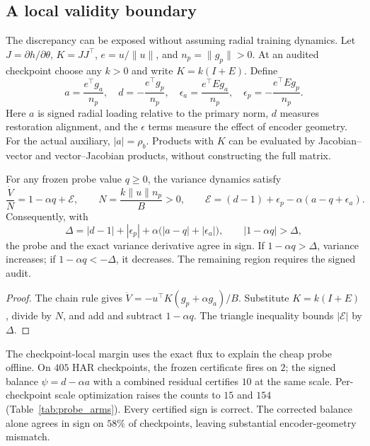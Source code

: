 \subsection{A local validity boundary}

The discrepancy can be exposed without assuming radial training dynamics. Let $J=\partial h/\partial\theta$, $K=JJ^\top$, $e=u/\|u\|$, and $n_p=\|g_p\|>0$. At an audited checkpoint choose any $k>0$ and write $K=k(I+E)$. Define
\begin{equation}
 a=\frac{e^\top g_a}{n_p},\quad d=-\frac{e^\top g_p}{n_p},\quad
 \epsilon_a=\frac{e^\top E g_a}{n_p},\quad
 \epsilon_p=-\frac{e^\top E g_p}{n_p}.
 \label{eq:boundary_terms}
\end{equation}
Here $a$ is signed radial loading relative to the primary norm, $d$ measures restoration alignment, and the $\epsilon$ terms measure the effect of encoder geometry. For the actual auxiliary, $|a|=\rho_b$. Products with $K$ can be evaluated by Jacobian--vector and vector--Jacobian products, without constructing the full matrix.

\begin{theorem}\label{thm:probe_boundary}
For any frozen probe value $q\ge0$, the variance dynamics satisfy
\begin{equation}
 \frac{\dot V}{N}=1-\alpha q+\mathcal E,\qquad
 N=\frac{k\|u\|n_p}{B}>0,\qquad
 \mathcal E=(d-1)+\epsilon_p-\alpha(a-q+\epsilon_a).
 \label{eq:probe_discrepancy}
\end{equation}
Consequently, with
\begin{equation}
 \Delta=|d-1|+|\epsilon_p|+\alpha\bigl(|a-q|+|\epsilon_a|\bigr),
 \qquad |1-\alpha q|>\Delta,
 \label{eq:validity_margin}
\end{equation}
the probe and the exact variance derivative agree in sign. If $1-\alpha q>\Delta$, variance increases; if $1-\alpha q<-\Delta$, it decreases. The remaining region requires the signed audit.
\end{theorem}
\begin{proof}
The chain rule gives $\dot V=-u^\top K(g_p+\alpha g_a)/B$. Substitute $K=k(I+E)$, divide by $N$, and add and subtract $1-\alpha q$. The triangle inequality bounds $|\mathcal E|$ by $\Delta$.
\end{proof}

The checkpoint-local margin uses the exact flux to explain the cheap probe offline. On $405$ HAR checkpoints, the frozen certificate fires on $2$; the signed balance $\psi=d-\alpha a$ with a combined residual certifies $10$ at the same scale. Per-checkpoint scale optimization raises the counts to $15$ and $154$ (Table~\ref{tab:probe_arms}). Every certified sign is correct. The corrected balance alone agrees in sign on $58\%$ of checkpoints, leaving substantial encoder-geometry mismatch.

